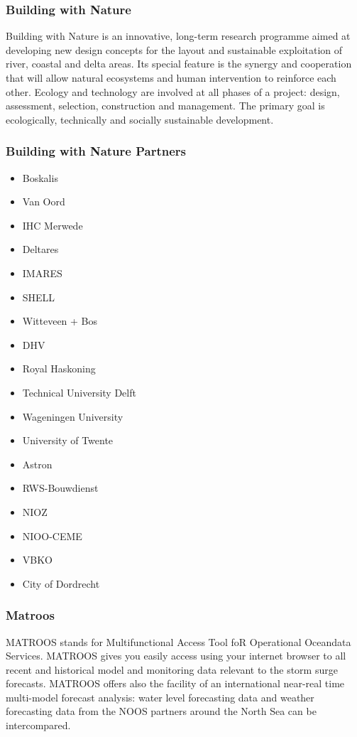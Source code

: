 \documentclass[]{beamer}
\begin{document}
\frame
{
  \frametitle{Building with Nature}
  Building with Nature is an innovative, long-term  
  research programme aimed at developing new design 
  concepts for the layout and sustainable exploitation of 
  river, coastal and delta areas. Its special feature is the 
  synergy and cooperation that will allow natural ecosystems and human intervention to reinforce each other. 
  Ecology and technology are involved at all phases of a 
  project: design, assessment, selection, construction and 
  management. The primary goal is ecologically, technically and socially sustainable development. 
}

\frame
{
  \frametitle{Building with Nature Partners}
  \begin{itemize}
  \item Boskalis
  \item Van Oord
  \item IHC Merwede
  \item Deltares
  \item IMARES 
  \item SHELL
  \item Witteveen + Bos
  \item DHV
  \item Royal Haskoning
  \item Technical University Delft
  \item Wageningen University
  \item University of Twente
  \item Astron
  \item RWS-Bouwdienst
  \item NIOZ
  \item NIOO-CEME
  \item VBKO
  \item City of Dordrecht
\end{itemize}
}

\frame
{
  \frametitle{Matroos}
  MATROOS stands for Multifunctional Access Tool foR Operational Oceandata Services. MATROOS gives you easily access using your internet browser to all recent and historical model and monitoring data relevant to the storm surge forecasts. MATROOS offers also the facility of an international near-real time multi-model forecast analysis: water level forecasting data and weather forecasting data from the NOOS partners around the North Sea can be intercompared.
}
\end{document}
